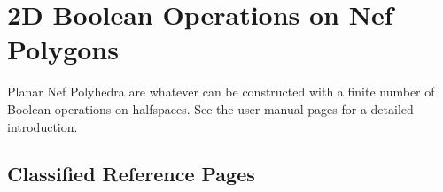 

\chapter{2D Boolean Operations on Nef Polygons}
\label{chap:nef_2_ref}

Planar Nef Polyhedra are whatever can be constructed with a finite number of
Boolean operations on halfspaces. See the user manual pages for a detailed
introduction.

\section{Classified Reference Pages}


 \\


 \\
 \\
 \\
 \\
 \\
 \\

